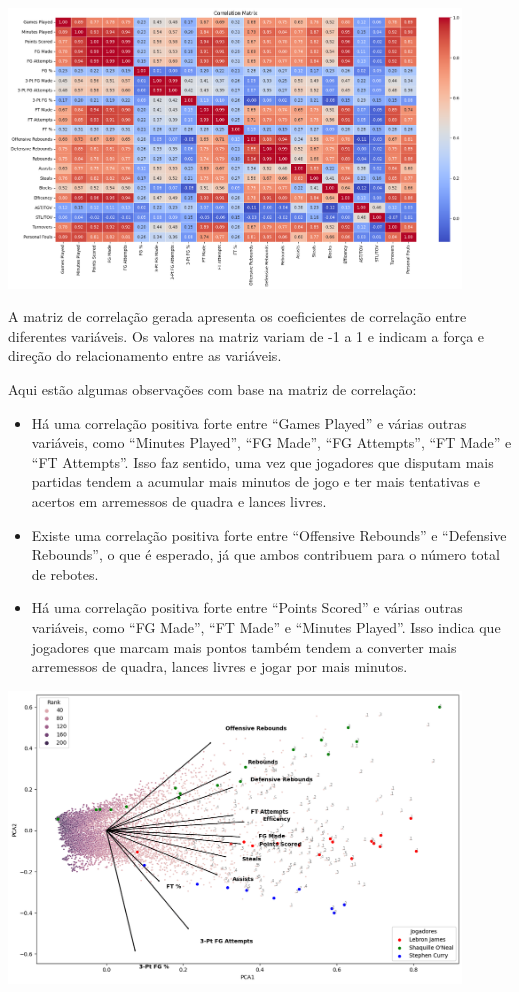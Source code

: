 \documentclass[
]{book}
\begin{document}
\includegraphics[width=0.9\textwidth,height=\textheight]{imagens/5.png}

A matriz de correlação gerada apresenta os coeficientes de correlação entre diferentes variáveis. Os valores na matriz variam de -1 a 1 e indicam a força e direção do relacionamento entre as variáveis.

Aqui estão algumas observações com base na matriz de correlação:

\begin{itemize}
\item
  Há uma correlação positiva forte entre ``Games Played'' e várias outras variáveis, como ``Minutes Played'', ``FG Made'', ``FG Attempts'', ``FT Made'' e ``FT Attempts''. Isso faz sentido, uma vez que jogadores que disputam mais partidas tendem a acumular mais minutos de jogo e ter mais tentativas e acertos em arremessos de quadra e lances livres.
\item
  Existe uma correlação positiva forte entre ``Offensive Rebounds'' e ``Defensive Rebounds'', o que é esperado, já que ambos contribuem para o número total de rebotes.
\item
  Há uma correlação positiva forte entre ``Points Scored'' e várias outras variáveis, como ``FG Made'', ``FT Made'' e ``Minutes Played''. Isso indica que jogadores que marcam mais pontos também tendem a converter mais arremessos de quadra, lances livres e jogar por mais minutos.
\end{itemize}

\includegraphics[width=0.9\textwidth,height=\textheight]{imagens/6.png}
\end{document}
